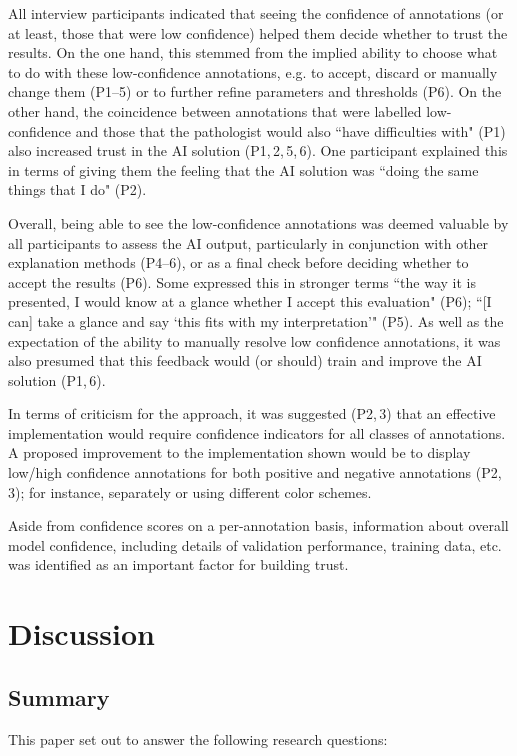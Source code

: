 \documentclass[final,5p,times,twocolumn,hyphens]{elsarticle}
\begin{document}
All interview participants indicated that seeing the confidence of annotations (or at least, those that were low confidence) helped them decide whether to trust the results. On the one hand, this stemmed from the implied ability to choose what to do with these low-confidence annotations, e.g. to accept, discard or manually change them (P1--5) or to further refine parameters and thresholds (P6). On the other hand, the coincidence between annotations that were labelled low-confidence and those that the pathologist would also ``have difficulties with" (P1) also increased trust in the AI solution (P1,\,2,\,5,\,6). One participant explained this in terms of giving them the feeling that the AI solution was ``doing the same things that I do" (P2). 

Overall, being able to see the low-confidence annotations was deemed valuable by all participants to assess the AI output, particularly in conjunction with other explanation methods (P4--6), or as a final check before deciding whether to accept the results (P6). Some expressed this in stronger terms ``the way it is presented, I would know at a glance whether I accept this evaluation" (P6); ``[I can] take a glance and say ‘this fits with my interpretation’" (P5). As well as the expectation of the ability to manually resolve low confidence annotations, it was also presumed that this feedback would (or should) train and improve the AI solution (P1,\,6).

In terms of criticism for the approach, it was suggested (P2,\,3) that an effective implementation would require confidence indicators for all classes of annotations. A proposed improvement to the implementation shown would be to display low/high confidence annotations for both positive and negative annotations (P2,\,3); for instance, separately or using different color schemes. 

Aside from confidence scores on a per-annotation basis, information about overall model confidence, including details of validation performance, training data, etc. was identified as an important factor for building trust.

\section{Discussion}
\label{sec:Discussion}

\subsection{Summary}
This paper set out to answer the following research questions:
\end{document}
